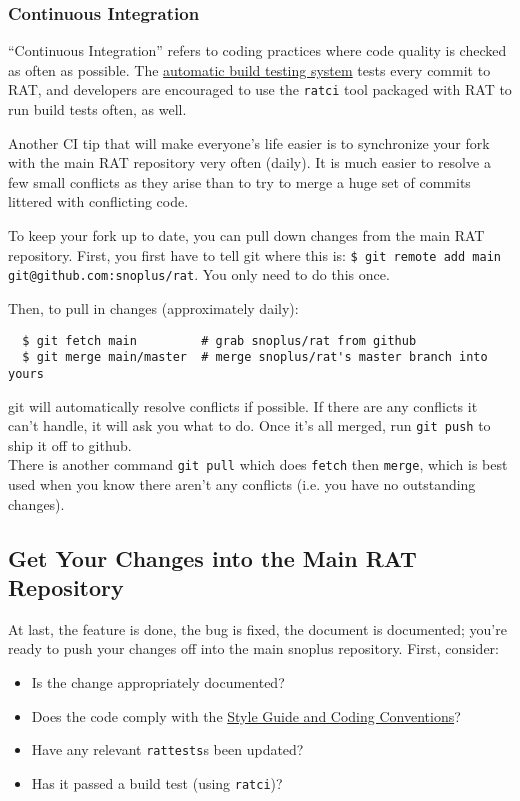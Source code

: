 \documentclass{article}
\begin{document}
\subsubsection{Continuous Integration}
``Continuous Integration'' refers to coding practices where code quality is checked as often as possible. The \href{http://ratbuild.hep.upenn.edu/snoplus/build}{automatic build testing system} tests every commit to RAT, and developers are encouraged to use the {\tt ratci} tool packaged with RAT to run build tests often, as well.

Another CI tip that will make everyone's life easier is to synchronize your fork with the main RAT repository very often (daily). It is much easier to resolve a few small conflicts as they arise than to try to merge a huge set of commits littered with conflicting code.

To keep your fork up to date, you can pull down changes from the main RAT repository. First, you first have to tell git where this is: {\tt \$ git remote add main git@github.com:snoplus/rat}. You only need to do this once.

Then, to pull in changes (approximately daily):
\begin{verbatim}
  $ git fetch main         # grab snoplus/rat from github
  $ git merge main/master  # merge snoplus/rat's master branch into yours
\end{verbatim}
git will automatically resolve conflicts if possible. If there are any conflicts it can't handle, it will ask you what to do. Once it's all merged, run {\tt git push} to ship it off to github.\\

There is another command {\tt git pull} which does {\tt fetch} then {\tt merge}, which is best used when you know there aren't any conflicts (i.e. you have no outstanding changes).

\subsection{Get Your Changes into the Main RAT Repository}
At last, the feature is done, the bug is fixed, the document is documented; you're ready to push your changes off into the main snoplus repository. First, consider:
\begin{itemize}
\item Is the change appropriately documented?
\item Does the code comply with the \href{https://www.snolab.ca/snoplus/private/DocDB/cgi/ShowDocument?docid=1018}{Style Guide and Coding Conventions}?
\item Have any relevant {\tt rattests}s been updated?
\item Has it passed a build test (using {\tt ratci})?
\end{itemize}
\end{document}
